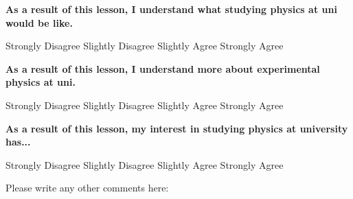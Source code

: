 \noindent \textbf{As a result of this lesson, I understand what studying physics at uni would be like.}

\vspace{3mm}
Strongly Disagree\hspace{1.5cm}	Slightly Disagree\hspace{1.5cm}	Slightly Agree\hspace{1.5cm}		Strongly Agree
\vspace{3mm}

\noindent \textbf{As a result of this lesson, I understand more about experimental physics at uni.}

\vspace{3mm}
Strongly Disagree\hspace{1.5cm}	Slightly Disagree\hspace{1.5cm}	Slightly Agree\hspace{1.5cm}		Strongly Agree
\vspace{3mm}

\noindent \textbf{As a result of this lesson, my interest in studying physics at university has...}

\vspace{3mm}
Strongly Disagree\hspace{1.5cm}	Slightly Disagree\hspace{1.5cm}	Slightly Agree\hspace{1.5cm}		Strongly Agree
\vspace{3mm}

\noindent Please write any other comments here:








